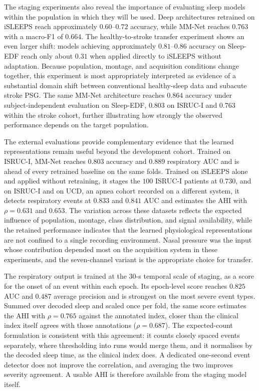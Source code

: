 \documentclass[a4paper,fleqn]{cas-sc}
\newcommand{\mmAcc}{0.763}
\newcommand{\mmMf}{0.664}
\newcommand{\mmAuc}{0.825}
\newcommand{\mmAp}{0.487}
\newcommand{\mmRho}{0.765}
\begin{document}
The staging experiments also reveal the importance of evaluating sleep models
within the population in which they will be used. Deep architectures retrained
on iSLEEPS reach approximately $0.60$--$0.72$ accuracy, while MM-Net reaches
$\mmAcc$ with a macro-F1 of $\mmMf$. The healthy-to-stroke transfer experiment
shows an even larger shift: models achieving approximately $0.81$--$0.86$
accuracy on Sleep-EDF reach only about $0.31$ when applied directly to iSLEEPS
without adaptation. Because population, montage, and acquisition conditions
change together, this experiment is most appropriately interpreted as evidence
of a substantial domain shift between conventional healthy-sleep data and
subacute stroke PSG. The same MM-Net architecture reaches $0.864$ accuracy under subject-independent evaluation on Sleep-EDF, $0.803$ on ISRUC-I and $\mmAcc$ within the stroke cohort, further illustrating how strongly the observed performance depends on the target population.

The external evaluations provide complementary evidence that the learned
representations remain useful beyond the development cohort. Trained on ISRUC-I, MM-Net reaches
$0.803$ accuracy and $0.889$ respiratory AUC and is ahead of every retrained baseline on the same
folds. Trained on iSLEEPS alone and applied without retraining, it stages the $100$ ISRUC-I
patients at $0.730$, and on ISRUC-I and on UCD, an apnea cohort recorded on a different system,
it detects respiratory events at $0.833$ and $0.841$ AUC and estimates the AHI with $\rho=0.631$
and $0.653$. The variation across these datasets reflects the expected influence of population,
montage, class distribution, and signal availability, while the retained performance indicates
that the learned physiological representations are not confined to a single recording
environment. Nasal pressure was the input whose contribution depended most on the acquisition system in these experiments, and the seven-channel variant is the appropriate choice for transfer.

The respiratory output is trained at the 30-s temporal scale of staging, as a score for the
onset of an event within each epoch. Its epoch-level score reaches $\mmAuc$ AUC and $\mmAp$
average precision and is strongest on the most severe event types. Summed over decoded sleep and
scaled once per fold, the same score estimates the AHI with $\rho=\mmRho$ against the annotated
index, closer than the clinical index itself agrees with those annotations ($\rho=0.687$). The expected-count formulation is consistent with this agreement: it counts closely spaced events separately, where thresholding into runs would merge them, and it normalises by the decoded sleep time, as the clinical index does. A dedicated one-second event detector does not
improve the correlation, and averaging the two improves severity agreement. A usable AHI is
therefore available from the staging model itself.
\end{document}
